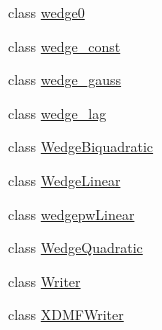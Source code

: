 \begin{DoxyCompactItemize}
\item 
class \mbox{\hyperlink{classfemus_1_1wedge0}{wedge0}}
\item 
class \mbox{\hyperlink{classfemus_1_1wedge__const}{wedge\+\_\+const}}
\item 
class \mbox{\hyperlink{classfemus_1_1wedge__gauss}{wedge\+\_\+gauss}}
\item 
class \mbox{\hyperlink{classfemus_1_1wedge__lag}{wedge\+\_\+lag}}
\item 
class \mbox{\hyperlink{classfemus_1_1_wedge_biquadratic}{Wedge\+Biquadratic}}
\item 
class \mbox{\hyperlink{classfemus_1_1_wedge_linear}{Wedge\+Linear}}
\item 
class \mbox{\hyperlink{classfemus_1_1wedgepw_linear}{wedgepw\+Linear}}
\item 
class \mbox{\hyperlink{classfemus_1_1_wedge_quadratic}{Wedge\+Quadratic}}
\item 
class \mbox{\hyperlink{classfemus_1_1_writer}{Writer}}
\item 
class \mbox{\hyperlink{classfemus_1_1_x_d_m_f_writer}{X\+D\+M\+F\+Writer}}
\end{DoxyCompactItemize}
